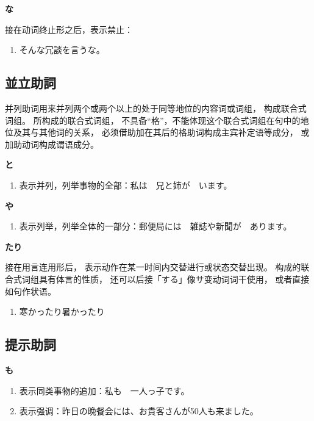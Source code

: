 {\bf
\noindent な
}

接在动词终止形之后，表示禁止：
\begin{enumerate}
  \item そんな冗談を言うな。
\end{enumerate}



\subsection{並立助詞}%

并列助词用来并列两个或两个以上的处于同等地位的内容词或词组，
构成联合式词组。
所构成的联合式词组，
不具备``格''，不能体现这个联合式词组在句中的地位及其与其他词的关系，
必须借助加在其后的格助词构成主宾补定语等成分，
或加助动词构成谓语成分。


{\bf
\noindent と
}

\begin{enumerate}
  \item 表示并列，列举事物的全部：私は　兄と姉が　います。
\end{enumerate}


{\bf
\noindent や
}

\begin{enumerate}
  \item 表示列举，列举全体的一部分：郵便局には　雑誌や新聞が　あります。
\end{enumerate}


{\bf
\noindent たり
}

接在用言连用形后，
表示动作在某一时间内交替进行或状态交替出现。
构成的联合式词组具有体言的性质，
还可以后接「する」像サ变动词词干使用，
或者直接如句作状语。

\begin{enumerate}
  \item 寒かったり暑かったり
\end{enumerate}


\subsection{提示助詞}%

{\bf
\noindent も
}

\begin{enumerate}
  \item 表示同类事物的追加：私も　一人っ子です。
  \item 表示强调：昨日の晩餐会には、お貴客さんが50人も来ました。
\end{enumerate}


